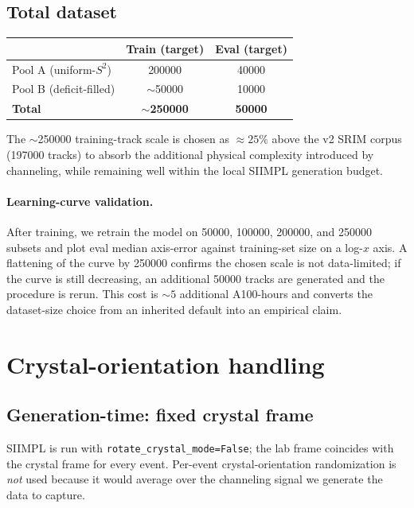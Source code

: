 \documentclass[11pt]{article}
\begin{document}
\subsection{Total dataset}

\begin{center}
  \begin{tabular}{lcc}
    \toprule
    & Train (target) & Eval (target) \\
    \midrule
    Pool A (uniform-$S^2$)             & \num{200000} & \num{40000} \\
    Pool B (deficit-filled)            & $\sim$\num{50000} & \num{10000} \\
    \midrule
    \textbf{Total}                     & $\sim$\textbf{\num{250000}} & \textbf{\num{50000}} \\
    \bottomrule
  \end{tabular}
\end{center}
The $\sim$\num{250000} training-track scale is chosen as $\approx 25\%$ above
the v2 SRIM corpus (\num{197000} tracks) to absorb the additional physical
complexity introduced by channeling, while remaining well within the local
SIIMPL generation budget.

\paragraph{Learning-curve validation.} After training, we retrain the model on
\num{50000}, \num{100000}, \num{200000}, and \num{250000} subsets and plot eval
median axis-error against training-set size on a log-$x$ axis. A flattening of
the curve by \num{250000} confirms the chosen scale is not data-limited; if the
curve is still decreasing, an additional \num{50000} tracks are generated and
the procedure is rerun. This cost is $\sim 5$ additional A100-hours and
converts the dataset-size choice from an inherited default into an empirical
claim.

\section{Crystal-orientation handling}

\subsection{Generation-time: fixed crystal frame}

SIIMPL is run with \texttt{rotate\_crystal\_mode=False}; the lab frame coincides
with the crystal frame for every event. Per-event crystal-orientation
randomization is \emph{not} used because it would average over the channeling
signal we generate the data to capture.
\end{document}
